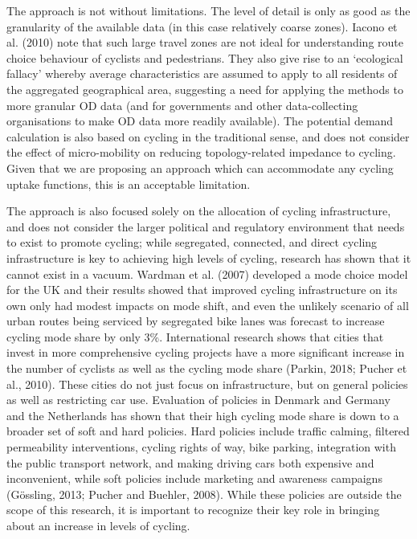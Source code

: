 \documentclass[
]{article}
\begin{document}
The approach is not without limitations. The level of detail is only as
good as the granularity of the available data (in this case relatively
coarse zones). Iacono et al. (2010) note that such large travel zones
are not ideal for understanding route choice behaviour of cyclists and
pedestrians. They also give rise to an `ecological fallacy' whereby
average characteristics are assumed to apply to all residents of the
aggregated geographical area, suggesting a need for applying the methods
to more granular OD data (and for governments and other
data-collecting organisations to make OD data more
readily available).
The potential demand calculation is also based on cycling in the traditional sense, and does not consider the
effect of micro-mobility on reducing topology-related impedance to cycling. Given that we are proposing an approach which can accommodate any cycling uptake functions, this is an acceptable limitation.

The approach is also focused solely on the allocation of cycling
infrastructure, and does not consider the larger political and
regulatory environment that needs to exist to promote cycling; while
segregated, connected, and direct cycling infrastructure is key to
achieving high levels of cycling, research has shown that it cannot
exist in a vacuum. Wardman et al. (2007) developed a mode choice model
for the UK and their results showed that improved cycling infrastructure
on its own only had modest impacts on mode shift, and even the unlikely
scenario of all urban routes being serviced by segregated bike lanes was
forecast to increase cycling mode share by only 3\%. International
research shows that cities that invest in more comprehensive cycling
projects have a more significant increase in the number of cyclists as
well as the cycling mode share (Parkin, 2018; Pucher et al., 2010). These cities do not just focus on
infrastructure, but on general policies as well as restricting car use.
Evaluation of policies in Denmark and Germany and the Netherlands has
shown that their high cycling mode share is down to a broader set of
soft and hard policies. Hard policies include traffic calming, filtered permeability
interventions, cycling rights of way, bike parking, integration with the
public transport network, and making driving cars both expensive and
inconvenient, while soft policies include marketing and awareness campaigns (Gössling, 2013; Pucher and Buehler, 2008). While these policies are outside the scope of this research, it is important to recognize their key role in
bringing about an increase in levels of cycling.
\end{document}
